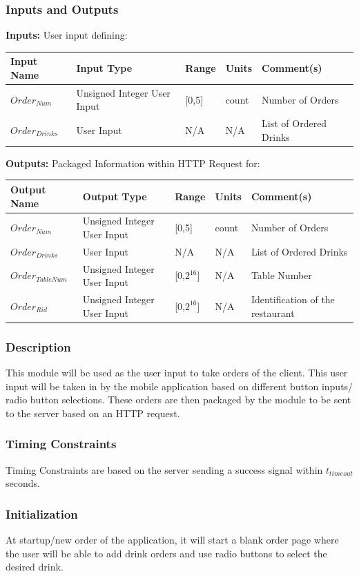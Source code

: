 \documentclass [10pt]{article}
\begin{document}
\subsubsection{Inputs and Outputs}

\textbf{Inputs: }  User input defining:

\begin{longtable}{|l|l|l|l|l|}\hline 
	\rowcolor{tableCell}Input Name & Input Type & Range & Units & Comment(s) \\ \hline
	$Order_{Num} $ & Unsigned Integer User Input & [0,5] & count &  Number of Orders \\ \hline
	$Order_{Drinks} $ &  User Input & N/A & N/A &  List of Ordered Drinks \\ \hline
\end{longtable}


\textbf{Outputs: } Packaged Information within HTTP Request for:
\begin{longtable}{|l|l|l|l|l|}\hline 
	\rowcolor{tableCell}Output Name & Output Type & Range & Units & Comment(s) \\ \hline
	$Order_{Num} $ & Unsigned Integer User Input & [0,5] & count &  Number of Orders \\ \hline
	$Order_{Drinks} $ &  User Input & N/A & N/A &  List of Ordered Drinks \\ \hline
	$Order_{TableNum} $ & Unsigned Integer User Input & [0,$2^{16}$] & N/A &  Table Number \\ \hline
	$Order_{Rid} $ & Unsigned Integer User Input & [0,$2^{16}$] & N/A & Identification of the restaurant \\ \hline
\end{longtable}
\subsubsection{Description}
This module will be used as the user input to take orders of the client. This user input will be taken in by the mobile application based on different button inputs/ radio button selections. These orders are then packaged by the module to be sent to the server based on an HTTP request.

\subsubsection{Timing Constraints}
Timing Constraints are based on the server sending a success signal within $ t_{timeout} $ seconds.

\subsubsection{Initialization}
At startup/new order of the application, it will start a blank order page where the user will be able to add drink orders and use radio buttons to select the desired drink.
\end{document}
